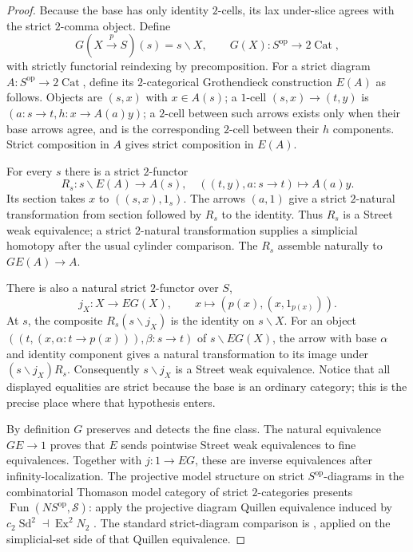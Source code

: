 \begin{proof}
Because the base has only identity $2$-cells, its lax under-slice
agrees with the strict $2$-comma object. Define
\[
 G(X\xrightarrow p S)(s)=s\backslash X,
 \qquad G(X):S^{\mathrm{op}}\longrightarrow2\operatorname{Cat},
\]
with strictly functorial reindexing by precomposition. For a
strict diagram $A:S^{\mathrm{op}}\to2\operatorname{Cat}$, define
its $2$-categorical Grothendieck construction $E(A)$ as follows.
Objects are $(s,x)$ with $x\in A(s)$; a $1$-cell
$(s,x)\to(t,y)$ is $(a:s\to t,h:x\to A(a)y)$; a $2$-cell
between such arrows exists only when their base arrows agree,
and is the corresponding $2$-cell between their $h$ components.
Strict composition in $A$ gives strict composition in $E(A)$.

For every $s$ there is a strict $2$-functor
\[
 R_s:s\backslash E(A)\longrightarrow A(s),
 \quad((t,y),a:s\to t)\longmapsto A(a)y.
\]
Its section takes $x$ to $((s,x),1_s)$. The arrows $(a,1)$
give a strict $2$-natural transformation from section followed
by $R_s$ to the identity. Thus $R_s$ is a Street weak
equivalence; a strict $2$-natural transformation supplies a
simplicial homotopy after the usual cylinder comparison. The
$R_s$ assemble naturally to $GE(A)\to A$.

There is also a natural strict $2$-functor over $S$,
\[
 j_X:X\longrightarrow EG(X),\qquad
 x\longmapsto(p(x),(x,1_{p(x)})).
\]
At $s$, the composite $R_s(s\backslash j_X)$ is the identity
on $s\backslash X$. For an object
$((t,(x,\alpha:t\to p(x))),\beta:s\to t)$ of
$s\backslash EG(X)$, the arrow with base $\alpha$ and
identity component gives a natural transformation to its image
under $(s\backslash j_X)R_s$. Consequently
$s\backslash j_X$ is a Street weak equivalence. Notice that
all displayed equalities are strict because the base is an
ordinary category; this is the precise place where that
hypothesis enters.

By definition $G$ preserves and detects the fine class. The
natural equivalence $GE\to1$ proves that $E$ sends pointwise
Street weak equivalences to fine equivalences. Together with
$j:1\to EG$, these are inverse equivalences after infinity-localization.
The projective model structure on strict $S^{\mathrm{op}}$-diagrams
in the combinatorial Thomason model category of strict
$2$-categories presents
$\operatorname{Fun}(NS^{\mathrm{op}},\mathcal S)$: apply the
projective diagram Quillen equivalence induced by
$c_2\operatorname{Sd}^2\dashv\operatorname{Ex}^2N_2$
\citep[Theorem 6.27 and Corollary 6.32]{GHIJAraMaltsiniotis2014}.
The standard strict-diagram comparison is
\citet[Proposition 4.2.4.4]{GHIJLurie2009}, applied on the
simplicial-set side of that Quillen equivalence.


\end{proof}
